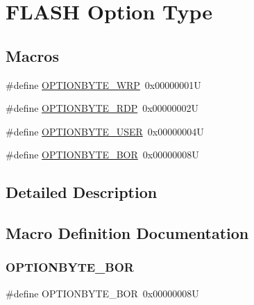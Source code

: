 \hypertarget{group___f_l_a_s_h_ex___option___type}{}\section{F\+L\+A\+SH Option Type}
\label{group___f_l_a_s_h_ex___option___type}
\subsection*{Macros}
\begin{DoxyCompactItemize}
\item 
\#define \hyperlink{group___f_l_a_s_h_ex___option___type_ga48712a166ea192ddcda0f2653679f9ec}{O\+P\+T\+I\+O\+N\+B\+Y\+T\+E\+\_\+\+W\+RP}~0x00000001U
\item 
\#define \hyperlink{group___f_l_a_s_h_ex___option___type_ga8f0bdb21ef13bae39d5d8b6619e2df06}{O\+P\+T\+I\+O\+N\+B\+Y\+T\+E\+\_\+\+R\+DP}~0x00000002U
\item 
\#define \hyperlink{group___f_l_a_s_h_ex___option___type_gac7d843e666e15c79688a1914e8ffe7a5}{O\+P\+T\+I\+O\+N\+B\+Y\+T\+E\+\_\+\+U\+S\+ER}~0x00000004U
\item 
\#define \hyperlink{group___f_l_a_s_h_ex___option___type_gaf4063216c8386467d187663190936c07}{O\+P\+T\+I\+O\+N\+B\+Y\+T\+E\+\_\+\+B\+OR}~0x00000008U
\end{DoxyCompactItemize}


\subsection{Detailed Description}


\subsection{Macro Definition Documentation}
\mbox{\label{group___f_l_a_s_h_ex___option___type_gaf4063216c8386467d187663190936c07}} 
\subsubsection{\texorpdfstring{O\+P\+T\+I\+O\+N\+B\+Y\+T\+E\+\_\+\+B\+OR}{OPTIONBYTE\_BOR}}
{\footnotesize\ttfamily \#define O\+P\+T\+I\+O\+N\+B\+Y\+T\+E\+\_\+\+B\+OR~0x00000008U}

